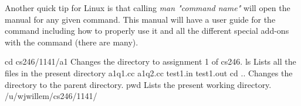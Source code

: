 Another quick tip for Linux is that calling \emph{man "command name"} will open the manual for any given command.  This manual will have a user guide for the command including how to properly use it and all the different special add-ons with the command (there are many).\\


\begin{code}[Bash]
cd cs246/1141/a1      Changes the directory to assignment 1 of cs246.
ls                    Lists all the files in the present directory
a1q1.cc a1q2.cc test1.in test1.out
cd ..                 Changes the directory to the parent directory.
pwd                   Lists the present working directory.
/u/wjwillem/cs246/1141/
\end{code}
